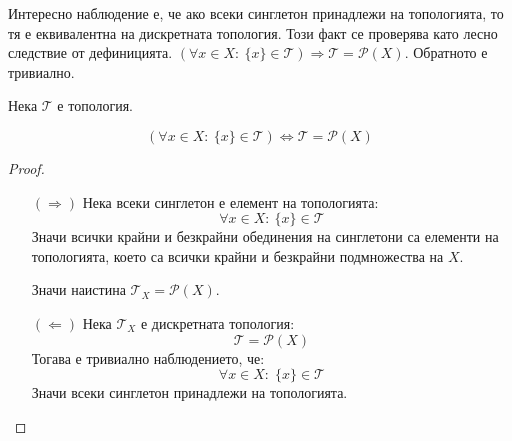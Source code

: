 Интересно наблюдение е, че ако всеки синглетон принадлежи на топологията, то тя е еквивалентна на дискретната топология. Този факт се проверява като лесно следствие от дефиницията. $(\forall x \in X:\ \{x\} \in \mathcal T) \Rightarrow \mathcal T = \mathcal P(X)$. Обратното е тривиално.
\begin{lemma}
    Нека $\mathcal T$ е топология.

    \begin{equation*}
        (\forall x \in X:\ \{x\} \in \mathcal T) \iff \mathcal T = \mathcal P (X)
    \end{equation*}
\end{lemma}
\begin{proof}
    \begin{itemize}
        \item[$(\Rightarrow)$] Нека всеки синглетон е елемент на топологията:
        \begin{equation}
            \forall x \in X:\ \{x\} \in \mathcal T
        \end{equation}
        Значи всички крайни и безкрайни обединения на синглетони са елементи на топологията, което са всички крайни и безкрайни подмножества на $X$.
        
        Значи наистина $\mathcal T_X = \mathcal P (X)$.

        \item[$(\Leftarrow)$] Нека $\mathcal T_X$ е дискретната топология:
        \begin{equation}
            \mathcal T = \mathcal P (X)
        \end{equation}
        Тогава е тривиално наблюдението, че:
        \begin{equation}
            \forall x \in X:\; \{x\} \in \mathcal T
        \end{equation}
        Значи всеки синглетон принадлежи на топологията.
    \end{itemize}
\end{proof}